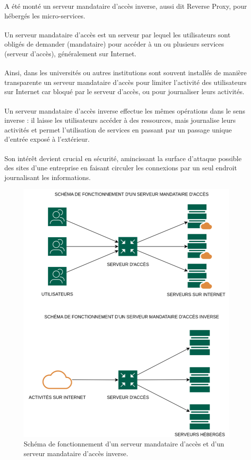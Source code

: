 \begin{sloppypar}
A été monté un serveur mandataire d'accès inverse, aussi dit Reverse Proxy, pour hébergés les micro-services.
\\ \\
Un serveur mandataire d'accès est un serveur par lequel les utilisateurs sont obligés de demander (mandataire) pour accéder à un ou plusieurs services (serveur d'accès), généralement sur Internet.
\\ \\
Ainsi, dans les universités ou autres institutions sont souvent installés de manière transparente un serveur mandataire d'accès pour limiter l'activité des utilisateurs sur Internet car bloqué par le serveur d'accès, ou pour journaliser leurs activités.
\\ \\
Un serveur mandataire d'accès inverse effectue les mêmes opérations dans le sens inverse : il laisse les utilisateurs accéder à des ressources, mais journalise leurs activités et permet l'utilisation de services en passant par un passage unique d'entrée exposé à l'extérieur.
\\ \\
Son intérêt devient crucial en sécurité, amincissant la surface d'attaque possible des sites d'une entreprise en faisant circuler les connexions par un seul endroit journalisant les informations.

\begin{figure}[H] %
  \centering
  \captionsetup{justification=centering}
  \includegraphics[scale = 0.2]{images/serveur_mandataire_acces.png}
  \caption{Schéma de fonctionnement d'un serveur mandataire d'accès et d'un serveur mandataire d'accès inverse.}  
  \label{fig:serveur_mandataire_acces} %
\end{figure}


\end{sloppypar}
